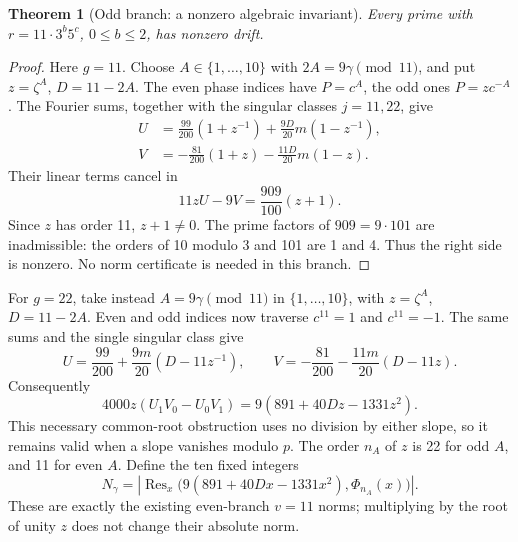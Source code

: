 \documentclass[10pt]{article}
\newtheorem{theorem}{Theorem}
\DeclareMathOperator{\Res}{Res}
\begin{document}
\begin{theorem}[Odd branch: a nonzero algebraic invariant]
Every prime with \(r=11\cdot3^b5^c\), \(0\le b\le2\), has nonzero drift.
\end{theorem}
\begin{proof}
Here \(g=11\). Choose \(A\in\{1,\ldots,10\}\) with
\(2A=9\gamma\pmod{11}\), and put \(z=\zeta^A\), \(D=11-2A\).
The even phase indices have \(P=c^A\), the odd ones \(P=zc^{-A}\).
The Fourier sums, together with the singular classes \(j=11,22\), give
\[
\begin{aligned}
U&=\frac{99}{200}(1+z^{-1})+\frac{9D}{20}m(1-z^{-1}),\\
V&=-\frac{81}{200}(1+z)-\frac{11D}{20}m(1-z).
\end{aligned}
\]
Their linear terms cancel in
\[
\boxed{11zU-9V=\frac{909}{100}(z+1).}
\]
Since \(z\) has order 11, \(z+1\ne0\). The prime factors of
\(909=9\cdot101\) are inadmissible: the orders of 10 modulo 3 and
101 are 1 and 4. Thus the right side is nonzero. No norm certificate
is needed in this branch.
\end{proof}

For \(g=22\), take instead \(A=9\gamma\pmod{11}\) in
\(\{1,\ldots,10\}\), with \(z=\zeta^A\), \(D=11-2A\).
Even and odd indices now traverse \(c^{11}=1\) and \(c^{11}=-1\).
The same sums and the single singular class give
\[
U=\frac{99}{200}+\frac{9m}{20}(D-11z^{-1}),\qquad
V=-\frac{81}{200}-\frac{11m}{20}(D-11z).
\]
Consequently
\[
4000z(U_1V_0-U_0V_1)=9(891+40Dz-1331z^2).
\tag{2}
\]
This necessary common-root obstruction uses no division by either
slope, so it remains valid when a slope vanishes modulo \(p\).
The order \(n_A\) of \(z\) is 22 for odd \(A\), and 11 for even \(A\).
Define the ten fixed integers
\[
N_\gamma=\left|\Res_x\bigl(9(891+40Dx-1331x^2),\Phi_{n_A}(x)\bigr)\right|.
\tag{3}
\]
These are exactly the existing even-branch \(v=11\) norms; multiplying
by the root of unity \(z\) does not change their absolute norm.
\end{document}
